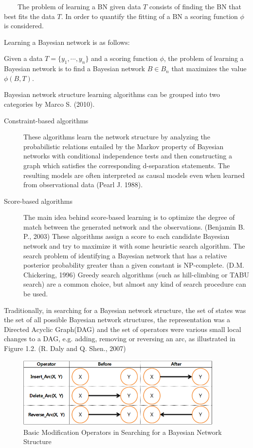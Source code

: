 ~~~~The problem of learning a BN given data $T$ consists of finding the BN that best fits the data $T$. In order to quantify the fitting of a BN a scoring function $\phi$ is considered.

Learning a Bayesian network is as follows:

Given a data $T = \{y_{1}, \cdots, y_{n}\}$ and a scoring function $\phi$, the problem of learning a Bayesian network is to find a Bayesian network $B \in B_{n}$ that maximizes the value $\phi(B, T)$.

Bayesian network structure learning algorithms can be grouped into two categories by Marco S. (2010).

\begin{description}

	\item[Constraint-based algorithms] These algorithms learn the network structure by analyzing the probabilistic relations entailed by the Markov property of Bayesian networks with conditional independence tests and then constructing a graph which satisfies the corresponding d-separation statements. The resulting models are often interpreted as causal models even when learned from observational data (Pearl J. 1988).
	
	\item[Score-based algorithms] The main idea behind score-based learning is to optimize the degree of match between the generated network and the observations. (Benjamin B. P., 2003) These algorithms assign a score to each candidate Bayesian network and try to maximize it with some heuristic search algorithm. The search problem of identifying a Bayesian network that has a relative posterior probability greater than a given constant is NP-complete. (D.M. Chickering, 1996) Greedy search algorithms (such as hill-climbing or TABU search) are a common choice, but almost any kind of search procedure can be used.
\end{description}

Traditionally, in searching for a Bayesian network structure, the set of states was the set of all possible Bayesian network structures, the representation was a Directed Acyclic Graph(DAG) and the set of operators were various small local changes to a DAG, e.g. adding, removing or reversing an arc, as illustrated in Figure 1.2. (R. Daly and Q. Shen., 2007)

\begin{figure}[!h]
	\centering
		\includegraphics[height=100pt]{images/DAG_Operators}
		\caption{Basic Modification Operators in Searching for a Bayesian Network Structure}
\end{figure}	
